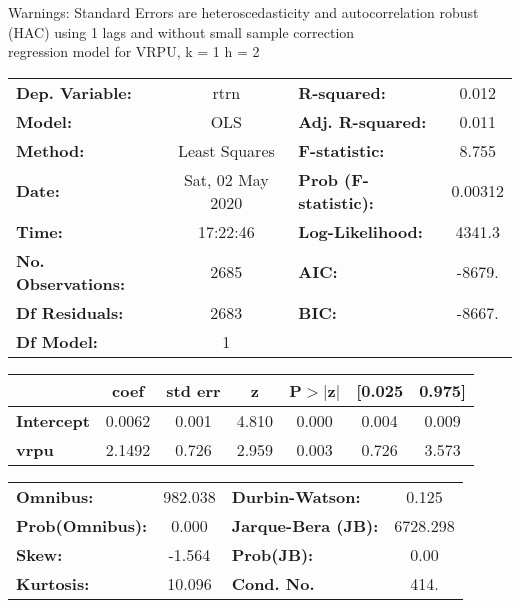 Warnings: \newline
 [1] Standard Errors are heteroscedasticity and autocorrelation robust (HAC) using 1 lags and without small sample correction\\ 

regression model for VRPU, k = 1 h = 2\begin{center}
\begin{tabular}{lclc}
\toprule
\textbf{Dep. Variable:}    &       rtrn       & \textbf{  R-squared:         } &     0.012   \\
\textbf{Model:}            &       OLS        & \textbf{  Adj. R-squared:    } &     0.011   \\
\textbf{Method:}           &  Least Squares   & \textbf{  F-statistic:       } &     8.755   \\
\textbf{Date:}             & Sat, 02 May 2020 & \textbf{  Prob (F-statistic):} &  0.00312    \\
\textbf{Time:}             &     17:22:46     & \textbf{  Log-Likelihood:    } &    4341.3   \\
\textbf{No. Observations:} &        2685      & \textbf{  AIC:               } &    -8679.   \\
\textbf{Df Residuals:}     &        2683      & \textbf{  BIC:               } &    -8667.   \\
\textbf{Df Model:}         &           1      & \textbf{                     } &             \\
\bottomrule
\end{tabular}
\begin{tabular}{lcccccc}
                   & \textbf{coef} & \textbf{std err} & \textbf{z} & \textbf{P$> |$z$|$} & \textbf{[0.025} & \textbf{0.975]}  \\
\midrule
\textbf{Intercept} &       0.0062  &        0.001     &     4.810  &         0.000        &        0.004    &        0.009     \\
\textbf{vrpu}      &       2.1492  &        0.726     &     2.959  &         0.003        &        0.726    &        3.573     \\
\bottomrule
\end{tabular}
\begin{tabular}{lclc}
\textbf{Omnibus:}       & 982.038 & \textbf{  Durbin-Watson:     } &    0.125  \\
\textbf{Prob(Omnibus):} &   0.000 & \textbf{  Jarque-Bera (JB):  } & 6728.298  \\
\textbf{Skew:}          &  -1.564 & \textbf{  Prob(JB):          } &     0.00  \\
\textbf{Kurtosis:}      &  10.096 & \textbf{  Cond. No.          } &     414.  \\
\bottomrule
\end{tabular}
\end{center}

